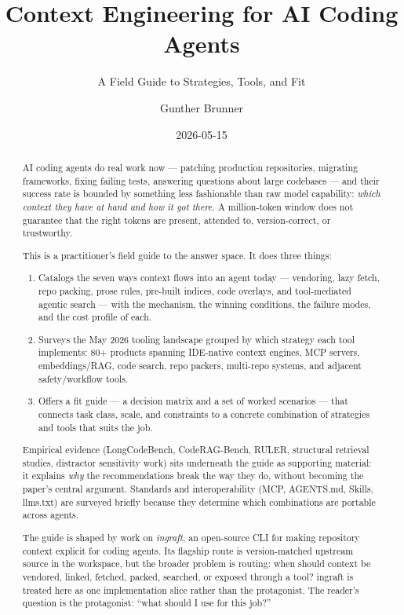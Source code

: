 \documentclass[
  11pt,
  letterpaper,
  numbers=noendperiod,
  parskip=half]{scrartcl}
\title{Context Engineering for AI Coding Agents}
\subtitle{A Field Guide to Strategies, Tools, and Fit}
\author{Gunther Brunner}
\date{2026-05-15}
\providecommand{\tightlist}{%
  \setlength{\itemsep}{0pt}\setlength{\parskip}{0pt}}
\begin{document}
\maketitle
\begin{abstract}
AI coding agents do real work now --- patching production repositories,
migrating frameworks, fixing failing tests, answering questions about
large codebases --- and their success rate is bounded by something less
fashionable than raw model capability: \emph{which context they have at
hand and how it got there.} A million-token window does not guarantee
that the right tokens are present, attended to, version-correct, or
trustworthy.

This is a practitioner's field guide to the answer space. It does three
things:

\begin{enumerate}
\def\labelenumi{\arabic{enumi}.}
\tightlist
\item
  Catalogs the seven ways context flows into an agent today --- vendoring,
  lazy fetch, repo packing, prose rules, pre-built indices, code overlays,
  and tool-mediated agentic search --- with the mechanism, the winning
  conditions, the failure modes, and the cost profile of each.
\item
  Surveys the May 2026 tooling landscape grouped by which strategy each
  tool implements: 80+ products spanning IDE-native context engines, MCP
  servers, embeddings/RAG, code search, repo packers, multi-repo systems,
  and adjacent safety/workflow tools.
\item
  Offers a fit guide --- a decision matrix and a set of worked scenarios
  --- that connects task class, scale, and constraints to a concrete
  combination of strategies and tools that suits the job.
\end{enumerate}

Empirical evidence (LongCodeBench, CodeRAG-Bench, RULER, structural
retrieval studies, distractor sensitivity work) sits underneath the guide
as supporting material: it explains \emph{why} the recommendations break
the way they do, without becoming the paper's central argument. Standards
and interoperability (MCP, AGENTS.md, Skills, llms.txt) are surveyed
briefly because they determine which combinations are portable across
agents.

The guide is shaped by work on \emph{ingraft}, an open-source CLI for
making repository context explicit for coding agents. Its flagship route
is version-matched upstream source in the workspace, but the broader
problem is routing: when should context be vendored, linked, fetched,
packed, searched, or exposed through a tool? ingraft is treated here as
one implementation slice rather than the protagonist. The reader's
question is the protagonist: ``what should I use for this job?''
\end{abstract}
\end{document}

